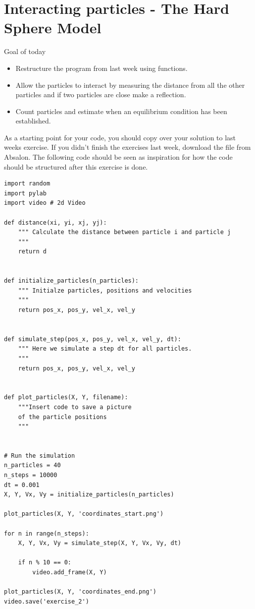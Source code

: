 \documentclass{article}
\begin{document}
\newpage
\section{Interacting particles - The Hard Sphere Model}

Goal of today

\begin{itemize}
  \item Restructure the program from last week using functions.
  \item Allow the particles to interact by measuring the distance from all the other particles
    and if two particles are close make a reflection.
  \item Count particles and estimate when an equilibrium condition has been established.
\end{itemize}

As a starting point for your code, you should copy over your solution to last
weeks exercise. If you didn't finish the exercises last week, download the file
 from Absalon. The following code should be seen as
inspiration for how the code should be structured after this exercise is done.

\begin{lstlisting}
import random
import pylab
import video # 2d Video

def distance(xi, yi, xj, yj):
    """ Calculate the distance between particle i and particle j
    """
    return d


def initialize_particles(n_particles):
    """ Initialze particles, positions and velocities
    """
    return pos_x, pos_y, vel_x, vel_y


def simulate_step(pos_x, pos_y, vel_x, vel_y, dt):
    """ Here we simulate a step dt for all particles.
    """
    return pos_x, pos_y, vel_x, vel_y


def plot_particles(X, Y, filename):
    """Insert code to save a picture
    of the particle positions
    """


# Run the simulation
n_particles = 40
n_steps = 10000
dt = 0.001
X, Y, Vx, Vy = initialize_particles(n_particles)

plot_particles(X, Y, 'coordinates_start.png')

for n in range(n_steps):
    X, Y, Vx, Vy = simulate_step(X, Y, Vx, Vy, dt)

    if n % 10 == 0:
        video.add_frame(X, Y)

plot_particles(X, Y, 'coordinates_end.png')
video.save('exercise_2')

\end{lstlisting}
\end{document}
